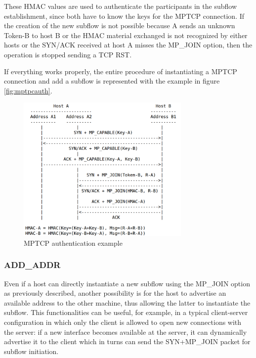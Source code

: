 These HMAC values are used to authenticate the participants in the subflow establishment, since both have to know the keys for the MPTCP connection. If the creation of the new subflow is not possible because A sends an unknown Token-B to host B or the HMAC material exchanged is not recognized by either hosts or the SYN/ACK received at host A misses the MP\_JOIN option, then the operation is stopped sending a TCP RST.


If everything works properly, the entire procedure of instantiating a MPTCP connection and add a subflow is represented with the example in figure \ref{fig:mptpcauth}. 

\begin{figure}[!htb]
\centering
\includegraphics[width=0.75\textwidth]{images/mptcpauth}
\caption{MPTCP authentication example}
\label{fig:mptcpauth}
\end{figure}


\subsubsection{ADD\_ADDR}
Even if a host can directly instantiate a new subflow using the MP\_JOIN option as previously described, another possibility is for the host to advertise an available address to the other machine, thus allowing the latter to instantiate the subflow.
This functionalities can be useful, for example, in a typical client-server configuration in which only the client is allowed to open new connections with the server: if a new interface becomes available at the server, it can dynamically advertise it to the client which in turns can send the SYN+MP\_JOIN packet for subflow initiation.


